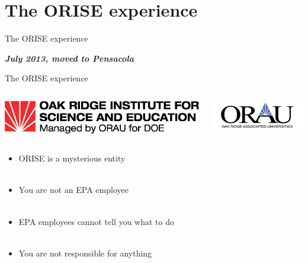 \documentclass[serif]{beamer}\usepackage[]{graphicx}\usepackage[]{color}
\newcommand{\emtxt}[1]{\textbf{\textit{#1}}}
\begin{document}
\section{The ORISE experience}

\begin{frame}{The ORISE experience}{}
\centerline{\emtxt{July 2013, moved to Pensacola}}
\vspace{0.15in}
\centerline{}
\end{frame}

\begin{frame}{The ORISE experience}{}
\begin{columns}
\begin{column}{0.67\textwidth}
\includegraphics[width=\textwidth]{fig/orise.jpg}
\end{column}
\begin{column}{0.33\textwidth}
\includegraphics[width=\textwidth]{fig/orau.jpg}
\end{column}
\end{columns}
\vspace{0.2in}
\begin{itemize}
\item<+-> ORISE is a mysterious entity \\~\\
\item<+-> You are not an EPA employee \\~\\
\item<+-> EPA employees cannot tell you what to do \\~\\
\item<+-> You are not responsible for anything
\end{itemize}
\end{frame}
\end{document}
